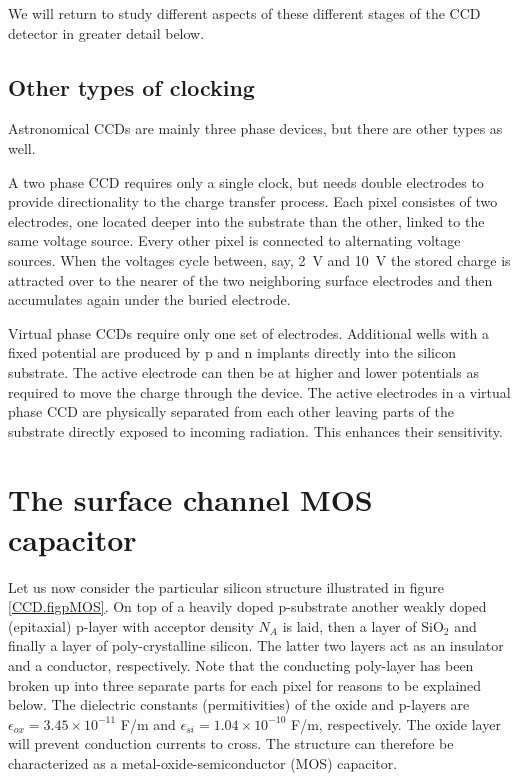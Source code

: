 We will return to study different aspects of these different stages of
the CCD detector in greater detail below.

\subsection{Other types of clocking}

Astronomical CCDs are mainly three phase devices, but there are other types
as well. 

A two phase CCD requires only a single clock, but needs double electrodes 
to provide directionality to the charge transfer process. Each pixel consistes
of two electrodes, one located deeper into the substrate than the other, 
linked to the same voltage source. Every other pixel is connected to 
alternating voltage sources. When the voltages cycle between, say, 2~V and
10~V the stored charge is attracted over to the nearer of the two neighboring
surface electrodes and then accumulates again under the buried electrode.

Virtual phase CCDs require only one set of electrodes. Additional wells with
a fixed potential are produced by p and n implants directly into the silicon
substrate. The active electrode can then be at higher and lower potentials 
as required to move the charge through the device. The active electrodes
in a virtual phase CCD are physically separated from each other leaving 
parts of the substrate directly exposed to incoming radiation. This 
enhances their sensitivity.

\section{The surface channel MOS capacitor}

Let us now consider the particular silicon structure illustrated in
figure \ref{CCD.figpMOS}. On top of a heavily doped p-substrate
another weakly doped (epitaxial) p-layer with acceptor density $N_A$
is laid, then a layer of SiO$_2$ and finally a layer of
poly-crystalline silicon. The latter two layers act as an insulator and
a conductor, respectively. Note that the conducting poly-layer has
been broken up into three separate parts for each pixel for reasons to
be explained below. The dielectric constants (permitivities) of the
oxide and p-layers are $\epsilon_{ox} = 3.45 \times 10^{-11}$ F/m and
$\epsilon_{si} = 1.04\times 10^{-10}$ F/m, respectively.  The oxide
layer will prevent conduction currents to cross. The structure can
therefore be characterized as a metal-oxide-semiconductor (MOS)
capacitor.

